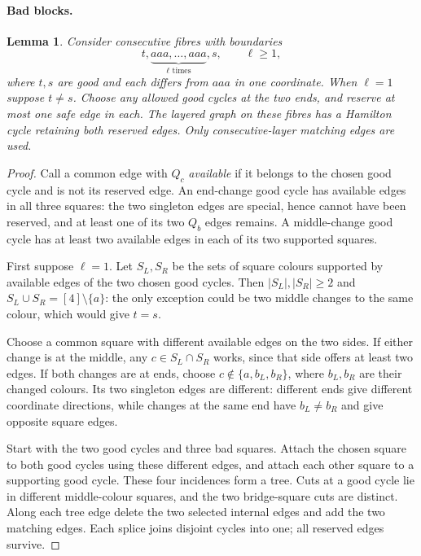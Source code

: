 \documentclass[11pt]{article}
\newtheorem{lemma}[theorem]{Lemma}
\theoremstyle{remark}
\numberwithin{equation}{section}
\numberwithin{table}{section}
\begin{document}
\paragraph{Bad blocks.}
\begin{lemma}\label{lem:badblock}
Consider consecutive fibres with boundaries
\[
             t,\underbrace{aaa,\ldots,aaa}_{\ell\text{ times}},s,
             \qquad \ell\ge1,
\]
where $t,s$ are good and each differs from $aaa$ in one coordinate.
When $\ell=1$ suppose $t\ne s$. Choose any allowed good cycles at
the two ends, and reserve at most one safe edge in each. The layered
graph on these fibres has a Hamilton cycle retaining both reserved
edges. Only consecutive-layer matching edges are used.
\end{lemma}
\begin{proof}
Call a common edge with $Q_c$ \emph{available} if it belongs to the
chosen good cycle and is not its reserved edge. An end-change good
cycle has available edges in all three squares: the two singleton
edges are special, hence cannot have been reserved, and at least one
of its two $Q_b$ edges remains. A middle-change good cycle has at least
two available edges in each of its two supported squares.

First suppose $\ell=1$. Let $S_L,S_R$ be the sets of square
colours supported by available edges of the two chosen good cycles.
Then $|S_L|,|S_R|\ge2$ and $S_L\cup S_R=[4]\setminus\{a\}$:
the only exception could be two middle changes to the same colour,
which would give $t=s$.

Choose a common square with different available edges on the two
sides. If either change is at the middle, any $c\in S_L\cap S_R$
works, since that side offers at least two edges. If both changes
are at ends, choose $c\notin\{a,b_L,b_R\}$, where $b_L,b_R$ are
their changed colours. Its two singleton edges are different:
different ends give different coordinate directions, while changes
at the same end have $b_L\ne b_R$ and give opposite square edges.

Start with the two good cycles and three bad squares. Attach the
chosen square to both good cycles using these different edges, and
attach each other square to a supporting good cycle. These four
incidences form a tree. Cuts at a good cycle lie in different
middle-colour squares, and the two bridge-square cuts are distinct.
Along each tree edge delete the two selected internal edges and add
the two matching edges. Each splice joins disjoint cycles into one;
all reserved edges survive.


\end{proof}
\end{document}
